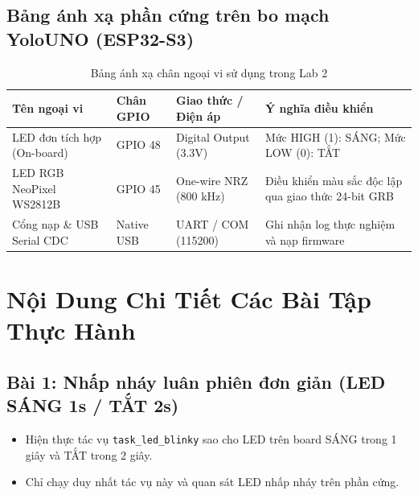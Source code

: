 \subsection{Bảng ánh xạ phần cứng trên bo mạch YoloUNO (ESP32-S3)}
\begin{table}[h!]
\centering
\small
\begin{tabularx}{\textwidth}{|>{\raggedright\arraybackslash}p{3.5cm}|>{\centering\arraybackslash}p{2.0cm}|>{\raggedright\arraybackslash}p{3.8cm}|>{\raggedright\arraybackslash}X|}
\hline
\textbf{Tên ngoại vi} & \textbf{Chân GPIO} & \textbf{Giao thức / Điện áp} & \textbf{Ý nghĩa điều khiển} \\
\hline
LED đơn tích hợp (On-board) & GPIO 48 & Digital Output (3.3V) & Mức HIGH (1): SÁNG; Mức LOW (0): TẮT \\
LED RGB NeoPixel WS2812B & GPIO 45 & One-wire NRZ (800 kHz) & Điều khiển màu sắc độc lập qua giao thức 24-bit GRB \\
Cổng nạp \& USB Serial CDC & Native USB & UART / COM (115200) & Ghi nhận log thực nghiệm và nạp firmware \\
\hline
\end{tabularx}
\vspace{0.2cm}
\caption{Bảng ánh xạ chân ngoại vi sử dụng trong Lab 2}
\label{tab:hardware_iot_lab2}
\end{table}

\newpage
\section{Nội Dung Chi Tiết Các Bài Tập Thực Hành}

\subsection{Bài 1: Nhấp nháy luân phiên đơn giản (LED SÁNG 1s / TẮT 2s)}

\begin{tcolorbox}[
    enhanced, colback=black!2, colframe=black!60, boxrule=1pt, arc=2.5mm, drop shadow,
    attach boxed title to top left={xshift=4mm, yshift=-3mm},
    boxed title style={enhanced, colback=black!85, colframe=black!85, boxrule=1pt, arc=2.5mm, drop shadow, left=6pt, right=6pt, top=2pt, bottom=2pt},
    title=\textcolor{white}{\large\textbf{Yêu cầu đề bài (Trích phiếu bài tập)}}
]
\bfseries
\vspace{0.2cm}
\begin{itemize}
    \item Hiện thực tác vụ \texttt{task\_led\_blinky} sao cho LED trên board SÁNG trong 1 giây và TẮT trong 2 giây.
    \item Chỉ chạy duy nhất tác vụ này và quan sát LED nhấp nháy trên phần cứng.
\end{itemize}
\end{tcolorbox}

